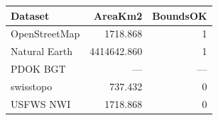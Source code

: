 \begingroup\small\setlength{\tabcolsep}{3pt}
\begin{longtable}{lrr}
\toprule
Dataset & AreaKm2 & BoundsOK \\
\midrule
OpenStreetMap & 1718.868 & 1 \\
Natural Earth & 4414642.860 & 1 \\
PDOK BGT & --- & --- \\
swisstopo & 737.432 & 0 \\
USFWS NWI & 1718.868 & 0 \\
\bottomrule
\end{longtable}
\endgroup
